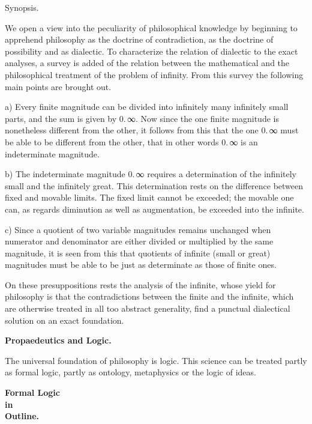 \documentclass[12pt,a4paper,openany]{book}
\newcommand{\opage}[1]{\marginnote{\footnotesize\textit{[#1]}}}
\begin{document}
\opage{1}\begin{center}{\large Synopsis.}\end{center}

We open a view into the peculiarity of philosophical knowledge by beginning to apprehend philosophy as the doctrine
of contradiction, as the doctrine of possibility and as dialectic. To characterize the relation of dialectic to the
exact analyses, a survey is added of the relation between the mathematical and the philosophical treatment of the
problem of infinity. From this survey the following main points are brought out.

a) Every finite magnitude can be divided into infinitely many infinitely small parts, and the sum is given by
0.\,∞. Now since the one finite magnitude is nonetheless different from the other, it follows from this that the one
0.\,∞ must be able to be different from the other, that in other words 0.\,∞ is an indeterminate magnitude.

b) The indeterminate magnitude 0.\,∞ requires a determination of the infinitely small and the infinitely great.
This determination rests on the difference between fixed and movable limits. The fixed limit cannot be exceeded; the
movable one can, as regards diminution as well as augmentation, be exceeded into the infinite.

c) Since a quotient of two variable magnitudes remains unchanged when numerator and denominator are either divided or
multiplied by the same magnitude, it is seen from this that quotients of infinite (small or great) magnitudes must be
able to be just as determinate as those of finite ones.

On these presuppositions rests the analysis of the infinite, whose yield for philosophy is that the contradictions
between the finite and the infinite, which are otherwise treated in all too abstract generality, find a punctual
dialectical solution on an exact foundation.

\opage{2}\begin{center}\textbf{Propaedeutics and Logic.}\end{center}

The universal foundation of philosophy is logic. This science can be treated partly as formal logic, partly as
ontology, metaphysics or the logic of ideas.

\begin{center}\textbf{Formal Logic}\\
\textbf{in}\\
\textbf{Outline.}\end{center}
\end{document}
